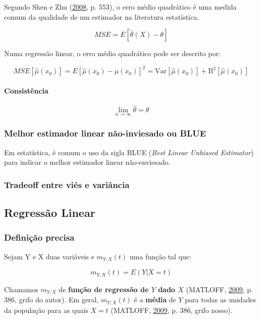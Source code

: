 \documentclass[a4paper]{article}
\let\oldparagraph\paragraph
\renewcommand{\paragraph}[1]{\oldparagraph{#1}\mbox{}}
\begin{document}
Segundo Shen e Zhu (\protect\hyperlink{ref-shen}{2008}, p. 553), o erro
médio quadrático é uma medida comum da qualidade de um estimador na
literatura estatística.

\[MSE = E[\hat{\theta}(X) - \theta]\]

Numa regressão linear, o erro médio quadrático pode ser descrito por:

\[MSE[\hat{\mu}(x_0)] = E[\hat{\mu}(x_0) - \mu(x_0)]^2 = \text{Var}[\hat{\mu}(x_0)] + \text{B}^2[\hat{\mu}(x_0)]\]

\paragraph{Consistência}\label{consistencia}

\[\lim_{n \rightarrow \infty}\hat{\theta} = \theta\]

\subsubsection{Melhor estimador linear não-inviesado ou
BLUE}\label{melhor-estimador-linear-nao-inviesado-ou-blue}

Em estatística, é comum o uso da sigla BLUE (\emph{Best Linear Unbiased
Estimator}) para indicar o melhor estimador linear não-enviesado.

\subsubsection{Tradeoff entre viés e
variância}\label{tradeoff-entre-vies-e-variancia}

\hypertarget{regressao-linear}{\subsection{Regressão
Linear}\label{regressao-linear}}

\subsubsection{Definição precisa}\label{definicao-precisa}

Sejam Y e X duas variáveis e \(m_{Y;X}(t)\) uma função tal que:

\[m_{Y;X}(t) = E(Y|X = t)\]

Chamamos \(m_{Y;X}\) de \textbf{função de regressão de \(Y\) dado \(X\)}
(MATLOFF, \protect\hyperlink{ref-matloff2009}{2009}, p. 386, grifo do
autor). Em geral, \(m_{Y;X}(t)\) é a \textbf{média} de \(Y\) para todas
as unidades da população para as quais \(X = t\) (MATLOFF,
\protect\hyperlink{ref-matloff2009}{2009}, p. 386, grifo nosso).
\end{document}

